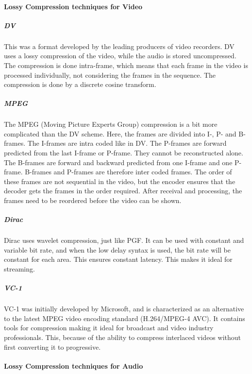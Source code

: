 \paragraph{Lossy Compression techniques for Video}

\subparagraph{DV} \hfill
\newline
This was a format developed by the leading producers of video recorders. DV uses a lossy compression of the video, while the audio is stored uncompressed. The compression is done intra-frame, which means that each frame in the video is processed individually, not considering the frames in the sequence. The compression is done by a discrete cosine transform.
\cite{bib:DV}

\newpage

\subparagraph{MPEG} \hfill
\newline
The MPEG (Moving Picture Experts Group) compression is a bit more complicated than the DV scheme. Here, the frames are divided into I-, P- and B-frames. The I-frames are intra coded like in DV. The P-frames are forward predicted from the last I-frame or P-frame. They cannot be reconstructed alone. The B-frames are forward and backward predicted from one I-frame and one P-frame. B-frames and P-frames are therefore inter coded frames. The order of these frames are not sequential in the video, but the encoder ensures that the decoder gets the frames in the order required. After receival and processing, the frames need to be reordered before the video can be shown.
\cite{bib:MPEG}


\subparagraph{Dirac} \hfill
\newline
Dirac uses wavelet compression, just like PGF. It can be used with constant and variable bit rate, and when the low delay syntax is used, the bit rate will be constant for each area. This ensures constant latency. This makes it ideal for streaming.
\cite{bib:Dirac}


\subparagraph{VC-1} \hfill
\newline
VC-1 was initially developed by Microsoft, and is characterized as an alternative to the latest MPEG video encoding standard (H.264/MPEG-4 AVC). It contains tools for compression making it ideal for broadcast and video industry professionals. This, because of the ability to compress interlaced videos without first converting it to progressive.
\cite{bib:VC-1}


\paragraph{Lossy Compression techniques for Audio}


